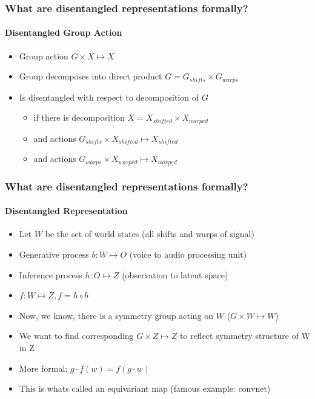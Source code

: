 \documentclass[9pt]{beamer}
\begin{document}
\begin{frame}
\frametitle{What are disentangled representations formally? }
\framesubtitle{Disentangled Group Action}
\begin{itemize}%
	\item Group action $G \times X \mapsto X$
	\item Group decomposes into direct product $G = G_{shifts} \times G_{warps}$
	\item Is disentangled with respect to decomposition of $G$
	\begin{itemize}
		\item if there is decomposition $X = X_{shifted} \times X_{warped}$
		\item and actions $G_{shifts} \times X_{shifted} \mapsto X_{shifted}$
		\item and actions $G_{warps} \times X_{warped} \mapsto X_{warped}$
	\end{itemize}
\end{itemize}
\end{frame} 

\begin{frame}
\frametitle{What are disentangled representations formally? }
\framesubtitle{Disentangled Representation}
\begin{itemize}%
	\item Let $W$ be the set of world states (all shifts and warps of signal)
	\item Generative process $b:W \mapsto O$ (voice to audio processing unit)
	\item Inference process $h: O \mapsto Z$ (observation to latent space)
	\item $f:W \mapsto Z, f = h \circ b$
	\item Now, we know, there is a symmetry group acting on $W$ ($G \times W \mapsto W$)
	\item We want to find corresponding $G \times Z \mapsto Z$ to reflect symmetry structure of W in Z
	\item More formal: $g \cdot f(w) = f(g\cdot w)$
	\item This is whats called an equivariant map (famous example: convnet)
\end{itemize}
\end{frame} 
\end{document}
